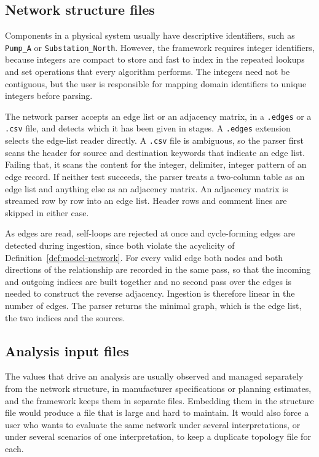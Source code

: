 \documentclass[12pt]{report}
\begin{document}
\subsection{Network structure files}
\label{sec:model-input-structure}

Components in a physical system usually have descriptive identifiers, such as
\texttt{Pump\_A} or \texttt{Substation\_North}. However, the framework requires integer identifiers, because integers are compact to store
and fast to index in the repeated lookups and set operations that every algorithm performs. The integers need not be contiguous, but the user is
responsible for mapping domain identifiers to unique integers before parsing.

The network parser accepts an edge list or an adjacency matrix, in a \texttt{.edges} or a
\texttt{.csv} file, and detects which it has been given in stages. A \texttt{.edges} extension
selects the edge-list reader directly. A \texttt{.csv} file is ambiguous, so the parser first
scans the header for source and destination keywords that indicate an edge list. Failing that,
it scans the content for the integer, delimiter, integer pattern of an edge record. If neither
test succeeds, the parser treats a two-column table as an edge list and anything else as an
adjacency matrix.
An adjacency matrix is streamed row by row into an edge list. Header rows and comment lines
are skipped in either case.

As edges are read, self-loops are rejected at once and cycle-forming edges are detected during
ingestion, since both violate the acyclicity of Definition~\ref{def:model-network}. For every
valid edge both nodes and both directions of the relationship are recorded in the same pass, so
that the incoming and outgoing indices are built together and no second pass over the edges
is needed to construct the reverse adjacency. Ingestion is therefore linear in the number of edges. The parser returns the minimal
graph, which is the edge list, the two indices and the sources.

\subsection{Analysis input files}
\label{sec:model-input-analysis}

The values that drive an analysis are usually observed and managed separately from the network
structure, in manufacturer specifications or planning estimates, and the
framework keeps them in separate files. Embedding them in the structure file would produce a file that is large and hard to maintain.
It would also force a user who wants to evaluate the same network under several interpretations, or
under several scenarios of one interpretation, to keep a duplicate topology file for each.
\end{document}
